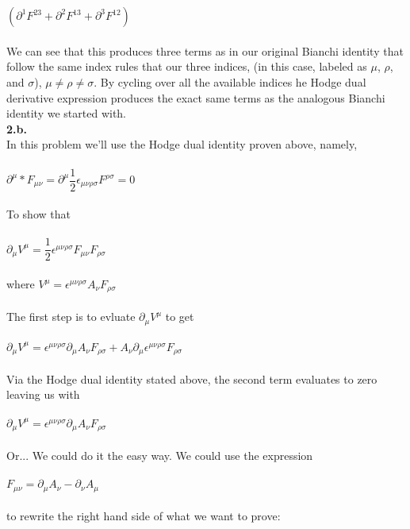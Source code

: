 \documentclass[prb,preprint]
{revtex4-1}
\newcommand{\PRLsep}{\noindent\makebox[\linewidth]{\resizebox{0.8888\linewidth}{2pt}{$\bullet$}}\bigskip}
\begin{document}
\\
\\
$\left(\partial^1 F^{23} + \partial^2 F^{13} +\partial^3 F^{12}\right)$
\\
\\
We can see that this produces three terms as in our original Bianchi identity that follow the same index rules that our three indices, (in this case, labeled as $\mu$, $\rho$, and $\sigma$), $\mu \neq \rho \neq \sigma$.  By cycling over all the available indices he Hodge dual derivative expression produces the exact same terms as the analogous Bianchi identity we started with.
\\
\PRLsep
\newpage
\textbf{2.b.}
\\
In this problem we'll use the Hodge dual identity proven above, namely, 
\\
\\
$\partial^\mu *F_{\mu\nu} = \partial^\mu \dfrac{1}{2}\epsilon_{\mu\nu\rho\sigma}F^{\rho\sigma} = 0$
\\
\\
To show that 
\\
\\
$\partial_\mu V^\mu = \dfrac{1}{2}\epsilon^{\mu\nu\rho\sigma}F_{\mu\nu}F_{\rho\sigma}$
\\
\\
where $V^\mu = \epsilon^{\mu\nu\rho\sigma}A_\nu F_{\rho\sigma}$
\\
\\
The first step is to evluate $\partial_\mu V^\mu$ to get
\\
\\
$\partial_\mu V^\mu = \epsilon^{\mu\nu\rho\sigma}\partial_\mu A_\nu F_{\rho\sigma} + A_\nu \partial_\mu\epsilon^{\mu\nu\rho\sigma} F_{\rho\sigma}$
\\
\\
Via the Hodge dual identity stated above, the second term evaluates to zero leaving us with 
\\
\\
$\partial_\mu V^\mu = \epsilon^{\mu\nu\rho\sigma}\partial_\mu A_\nu F_{\rho\sigma}$
\\
\\
Or... We could do it the easy way.  We could use the expression 
\\
\\
$F_{\mu\nu} = \partial_\mu A_\nu - \partial_\nu A_\mu$ 
\\
\\
to rewrite the right hand side of what we want to prove:
\\
\end{document}
